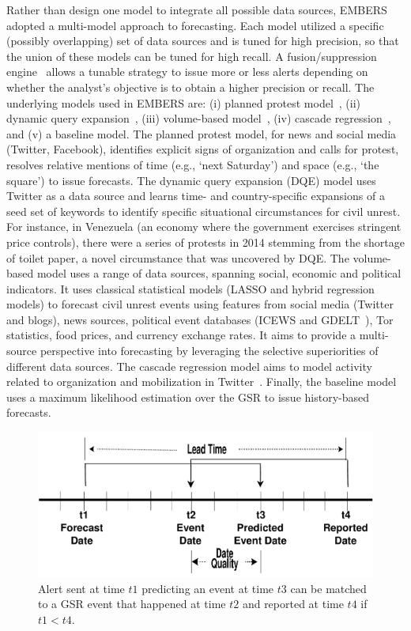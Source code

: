 Rather than design one model to integrate all possible data sources, EMBERS adopted a multi-model
approach to forecasting. Each model utilized a specific (possibly overlapping) set of data sources
and is tuned for high precision, so that the union of these models can be tuned for high recall.
A fusion/suppression engine~\cite{andy-scotland-paper} allows a tunable
strategy to issue more or less
alerts depending on whether the analyst's objective is to obtain a higher
precision or recall. The
underlying models used in EMBERS are: (i) planned protest model~\cite{pp-paper1,pp-paper2},
(ii) dynamic query expansion~\cite{dqe-plosone}, (iii) volume-based model~\cite{asonam},
(iv) cascade regression~\cite{anil-plosone}, and (v) a baseline model. The planned protest model,
for news and social media (Twitter, Facebook), identifies explicit signs of organization and calls
for protest, resolves relative mentions of time (e.g., `next Saturday') and space (e.g., `the square')
to issue forecasts. The dynamic query expansion (DQE) model uses Twitter as a data source and learns time- and country-specific
expansions of a seed set of keywords to identify specific situational circumstances for civil unrest.
For instance, in Venezuela (an economy where the government exercises stringent price controls),
there were a series of protests in 2014 stemming from the shortage of toilet paper, a novel circumstance
that was uncovered by DQE. The volume-based model uses a range of data sources, spanning
social, economic
and political indicators. It uses classical statistical models (LASSO
and hybrid regression models) to forecast civil unrest events using features
from social media (Twitter and blogs), news sources,
political event databases (ICEWS and GDELT~\cite{gdelt}), Tor~\cite{tor} statistics, food prices, and currency
exchange rates. It aims to provide a multi-source perspective into forecasting by leveraging
the selective superiorities of different data sources.  The cascade regression model
aims to model activity related to organization and mobilization in Twitter~\cite{anil-plosone}.
Finally, the baseline model uses a maximum likelihood
estimation over the GSR to issue history-based forecasts.

\begin{figure}
\includegraphics[width=\columnwidth]{figures/cu/timeline.pdf}
\caption{Alert sent at time $t1$ predicting an event at time $t3$
can be matched to a GSR event that happened at time $t2$ and reported
at time $t4$ if $t1 < t4$.}
\label{fig:leadtime}
\end{figure}

